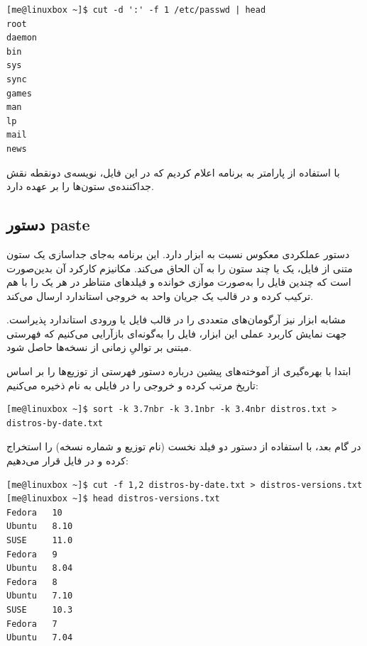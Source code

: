 \begin{latin}
\begin{lstlisting}
[me@linuxbox ~]$ cut -d ':' -f 1 /etc/passwd | head
root
daemon
bin
sys
sync
games
man
lp
mail
news
\end{lstlisting}
\end{latin}

با استفاده از پارامتر  به برنامه اعلام کردیم که در این فایل، نویسه‌ی دونقطه نقش جداکننده‌ی ستون‌ها را بر عهده دارد.

\subsection{دستور paste}

دستور  عملکردی معکوس نسبت به ابزار  دارد. این برنامه به‌جای جداسازی یک ستون متنی از فایل، یک یا چند ستون را به آن الحاق می‌کند. مکانیزم کارکرد آن بدین‌صورت است که چندین فایل را به‌صورت موازی خوانده و فیلدهای متناظر در هر یک را با هم ترکیب کرده و در قالب یک جریان واحد به خروجی استاندارد ارسال می‌کند.

مشابه  ابزار  نیز آرگومان‌های متعددی را در قالب فایل یا ورودی استاندارد پذیراست. جهت نمایش کاربرد عملی این ابزار، فایل  را به‌گونه‌ای بازآرایی می‌کنیم که فهرستی مبتنی بر توالیِ زمانی از نسخه‌ها حاصل شود.

ابتدا با بهره‌گیری از آموخته‌های پیشین درباره دستور  فهرستی از توزیع‌ها را بر اساس تاریخ مرتب کرده و خروجی را در فایلی به نام  ذخیره می‌کنیم:

\begin{latin}
\begin{lstlisting}
[me@linuxbox ~]$ sort -k 3.7nbr -k 3.1nbr -k 3.4nbr distros.txt > distros-by-date.txt
\end{lstlisting}
\end{latin}

در گام بعد، با استفاده از دستور  دو فیلد نخست (نام توزیع و شماره نسخه) را استخراج کرده و در فایل  قرار می‌دهیم:

\begin{latin}
\begin{lstlisting}
[me@linuxbox ~]$ cut -f 1,2 distros-by-date.txt > distros-versions.txt
[me@linuxbox ~]$ head distros-versions.txt
Fedora   10
Ubuntu   8.10
SUSE     11.0
Fedora   9
Ubuntu   8.04
Fedora   8
Ubuntu   7.10
SUSE     10.3
Fedora   7
Ubuntu   7.04
\end{lstlisting}
\end{latin}

